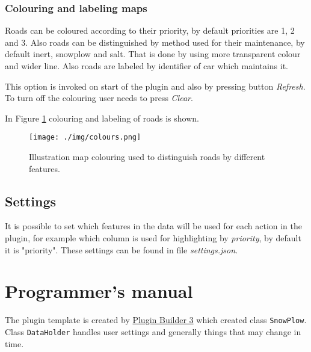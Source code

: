 \documentclass[12pt,a4paper]{article}
\newcommand{\cd}[1]{\texttt{#1}}
\begin{document}
\subsubsection{Colouring and labeling maps}
Roads can be coloured according to their priority, by default priorities are 1, 2 and 3. 
Also roads can be distinguished by method used for their maintenance, by default inert, snowplow and salt. 
That is done by using more transparent colour and wider line.
Also roads are labeled by identifier of car which maintains it.

\par This option is invoked on start of the plugin and also by pressing button \emph{Refresh}.
To turn off the colouring user needs to press \emph{Clear}.

\par In Figure \ref{colours} colouring and labeling of roads is shown.

\begin{figure}[H]\centering
\texttt{[image: ./img/colours.png]}
\caption{Illustration map colouring used to distinguish roads by different features.}
\label{colours}
\end{figure}

\subsection{Settings}
It is possible to set which features in the data will be used for each action in the plugin, for example which column is used for highlighting by \emph{priority}, by default it is "priority".
These settings can be found in file \emph{settings.json}.

\section{Programmer's manual}
The plugin template is created by \href{http://g-sherman.github.io/Qgis-Plugin-Builder/}{Plugin Builder 3} which created class \cd{SnowPlow}.
Class \cd{DataHolder} handles user settings and generally things that may change in time.
\end{document}
